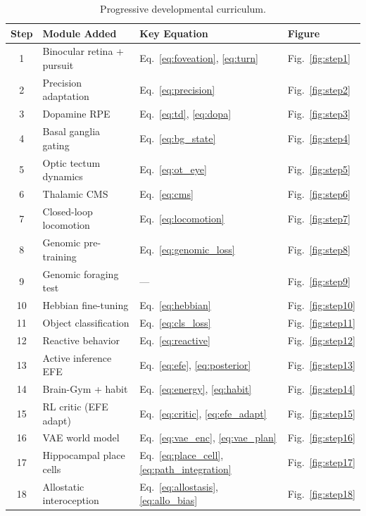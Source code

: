 \documentclass[11pt,a4paper]{article}
\begin{document}
\begin{table}[H]
\centering
\caption{Progressive developmental curriculum.}
\label{tab:steps}
\begin{tabular}{clll}
\toprule
Step & Module Added & Key Equation & Figure \\
\midrule
1  & Binocular retina + pursuit & Eq.~\ref{eq:foveation}, \ref{eq:turn} & Fig.~\ref{fig:step1} \\
2  & Precision adaptation  & Eq.~\ref{eq:precision}        & Fig.~\ref{fig:step2} \\
3  & Dopamine RPE          & Eq.~\ref{eq:td}, \ref{eq:dopa} & Fig.~\ref{fig:step3} \\
4  & Basal ganglia gating  & Eq.~\ref{eq:bg_state}          & Fig.~\ref{fig:step4} \\
5  & Optic tectum dynamics & Eq.~\ref{eq:ot_eye}             & Fig.~\ref{fig:step5} \\
6  & Thalamic CMS          & Eq.~\ref{eq:cms}                & Fig.~\ref{fig:step6} \\
7  & Closed-loop locomotion & Eq.~\ref{eq:locomotion}        & Fig.~\ref{fig:step7} \\
8  & Genomic pre-training  & Eq.~\ref{eq:genomic_loss}       & Fig.~\ref{fig:step8} \\
9  & Genomic foraging test & ---                              & Fig.~\ref{fig:step9} \\
10 & Hebbian fine-tuning   & Eq.~\ref{eq:hebbian}            & Fig.~\ref{fig:step10} \\
11 & Object classification & Eq.~\ref{eq:cls_loss}            & Fig.~\ref{fig:step11} \\
12 & Reactive behavior     & Eq.~\ref{eq:reactive}            & Fig.~\ref{fig:step12} \\
13 & Active inference EFE  & Eq.~\ref{eq:efe}, \ref{eq:posterior} & Fig.~\ref{fig:step13} \\
14 & Brain-Gym + habit    & Eq.~\ref{eq:energy}, \ref{eq:habit}  & Fig.~\ref{fig:step14} \\
15 & RL critic (EFE adapt) & Eq.~\ref{eq:critic}, \ref{eq:efe_adapt} & Fig.~\ref{fig:step15} \\
16 & VAE world model       & Eq.~\ref{eq:vae_enc}, \ref{eq:vae_plan} & Fig.~\ref{fig:step16} \\
17 & Hippocampal place cells & Eq.~\ref{eq:place_cell}, \ref{eq:path_integration} & Fig.~\ref{fig:step17} \\
18 & Allostatic interoception & Eq.~\ref{eq:allostasis}, \ref{eq:allo_bias} & Fig.~\ref{fig:step18} \\

\end{tabular}
\end{table}
\end{document}

